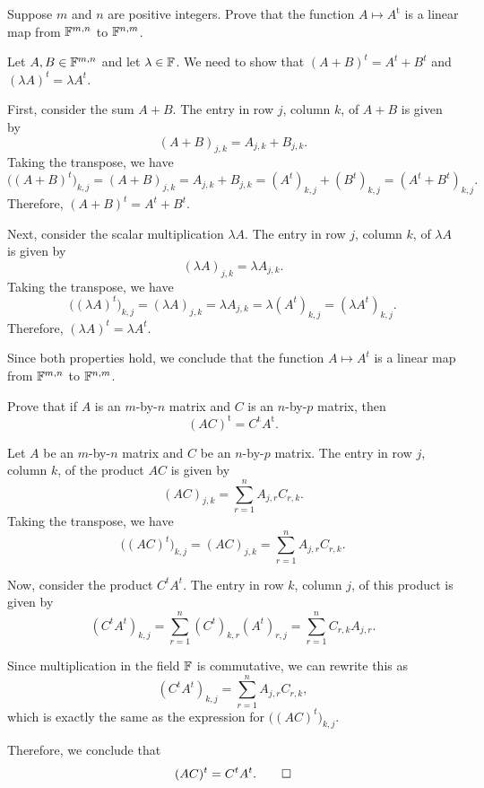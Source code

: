 \begin{exercise}
Suppose $m$ and $n$ are positive integers. Prove that the function
$A\mapsto A^{\mathrm{t}}$ is a linear map from $\mathbb{F}^{m,n}$ to $\mathbb{F}^{n,m}$.
\end{exercise}
\begin{solution}
Let $A,B\in\mathbb{F}^{m,n}$ and let $\lambda\in\mathbb{F}$. We need to show that
$(A+B)^t=A^t+B^t$ and $(\lambda A)^t=\lambda A^t$.

First, consider the sum $A+B$. The entry in row $j$, column $k$, of $A+B$ is
given by
\[ (A+B)_{j,k} = A_{j,k}+B_{j,k}. \]
Taking the transpose, we have
\[ \bigl((A+B)^t\bigr)_{k,j} = (A+B)_{j,k} = A_{j,k}+B_{j,k}
   = (A^t)_{k,j}+(B^t)_{k,j} = (A^t+B^t)_{k,j}. \]
Therefore, $(A+B)^t=A^t+B^t$.

Next, consider the scalar multiplication $\lambda A$. The entry in row $j$,
column $k$, of $\lambda A$ is given by
\[ (\lambda A)_{j,k} = \lambda A_{j,k}. \]
Taking the transpose, we have
\[ \bigl((\lambda A)^t\bigr)_{k,j} = (\lambda A)_{j,k} = \lambda A_{j,k}
   = \lambda(A^t)_{k,j} = (\lambda A^t)_{k,j}. \]
Therefore, $(\lambda A)^t=\lambda A^t$.

Since both properties hold, we conclude that the function $A\mapsto A^t$ is a
linear map from $\mathbb{F}^{m,n}$ to $\mathbb{F}^{n,m}$.
\end{solution}

\begin{exercise}
Prove that if $A$ is an $m$-by-$n$ matrix and $C$ is an $n$-by-$p$ matrix,
then
\[ (AC)^{\mathrm{t}} = C^{\mathrm{t}}A^{\mathrm{t}}. \]
\end{exercise}
\begin{solution}
Let $A$ be an $m$-by-$n$ matrix and $C$ be an $n$-by-$p$ matrix. The entry in
row $j$, column $k$, of the product $AC$ is given by
\[ (AC)_{j,k} = \sum_{r=1}^n A_{j,r}C_{r,k}. \]
Taking the transpose, we have
\[ \bigl((AC)^t\bigr)_{k,j} = (AC)_{j,k} = \sum_{r=1}^n A_{j,r}C_{r,k}. \]

Now, consider the product $C^tA^t$. The entry in row $k$, column $j$, of this
product is given by
\[ (C^tA^t)_{k,j} = \sum_{r=1}^n (C^t)_{k,r}(A^t)_{r,j}
   = \sum_{r=1}^n C_{r,k}A_{j,r}. \]

Since multiplication in the field $\mathbb{F}$ is commutative, we can rewrite this as
\[ (C^tA^t)_{k,j} = \sum_{r=1}^n A_{j,r}C_{r,k}, \]
which is exactly the same as the expression for $\bigl((AC)^t\bigr)_{k,j}$.

Therefore, we conclude that
\[ (AC)^t = C^tA^t. \qedhere \]
\end{solution}

